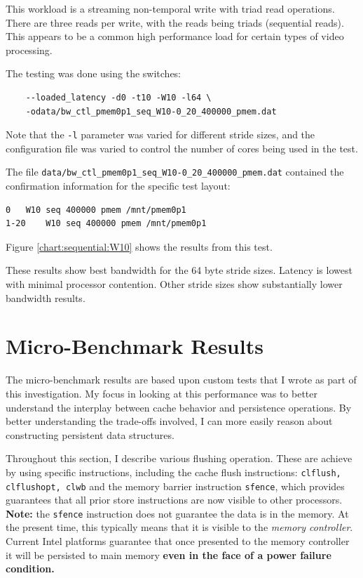 This workload is a streaming non-temporal write with
triad read operations.  There are three reads per write, with
the reads being triads (sequential reads).  This appears to
be a common high performance load for certain types of
video processing.

The testing was done using the switches:

\begin{verbatim}
    --loaded_latency -d0 -t10 -W10 -l64 \
    -odata/bw_ctl_pmem0p1_seq_W10-0_20_400000_pmem.dat
\end{verbatim}

Note that the \verb+-l+ parameter was varied for different
stride sizes, and the configuration file was varied to control
the number of cores being used in the test.

The file \verb+data/bw_ctl_pmem0p1_seq_W10-0_20_400000_pmem.dat+ contained the confirmation information
for the specific test layout:

\begin{verbatim}
0	W10 seq 400000 pmem /mnt/pmem0p1
1-20	W10 seq 400000 pmem /mnt/pmem0p1
\end{verbatim}

Figure \ref{chart:sequential:W10} shows the results from this test.

These results show best bandwidth for the 64 byte stride sizes.
Latency is lowest with minimal processor contention.  Other
stride sizes show substantially lower bandwidth results.

\section{Micro-Benchmark Results}\label{section:results:micro}

The micro-benchmark results are based upon custom tests that
I wrote as part of this investigation.  My focus in looking
at this performance was to better understand the interplay
between cache behavior and persistence operations.  By better
understanding the trade-offs involved, I can more easily reason
about constructing persistent data structures.

Throughout this section, I describe various flushing operation.
These are achieve by using specific instructions, including
the cache flush instructions: \texttt{clflush, clflushopt, clwb}
and the memory barrier instruction \texttt{sfence}, which
provides guarantees that all prior store instructions are now
visible to other processors.  \textbf{Note:} the \texttt{sfence}
instruction does not guarantee the data is in the memory. 
At the present time, this typically means that it is visible
to the \textit{memory controller}.  Current Intel platforms
guarantee that once presented to the memory controller it will
be persisted to main memory \textbf{even in the face of a power failure condition.}

